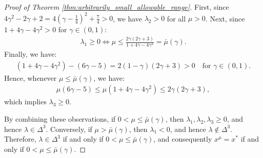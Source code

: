 \documentclass{article}
\theoremstyle{plain}
\begin{document}
\begin{proof}[Proof of Theorem \ref{thm:arbitrarily_small_allowable_range}]
    First, since $4\gamma^2 - 2\gamma + 2 = 4(\gamma - \tfrac{1}{4})^2 + \tfrac{7}{4} > 0$, we have $\lambda_2 > 0$ for all $\mu > 0$.
    Next, since $1 + 4\gamma - 4\gamma^2 > 0$ for $\gamma \in (0, 1)$:
    \begin{align*}
        \lambda_1 \geq 0 \Leftrightarrow \mu \leq \frac{2\gamma(2\gamma+3)}{1 + 4\gamma - 4\gamma^2} = \bar{\mu}(\gamma).
    \end{align*}
    Finally, we have:
    \begin{align*}
        (1 + 4\gamma - 4\gamma^2) - (6\gamma - 5) = 2(1-\gamma)(2\gamma + 3) > 0 \quad \text{for } \gamma \in (0, 1).
    \end{align*}
    Hence, whenever $\mu \leq \bar{\mu}(\gamma)$, we have:
    \begin{align*}
        \mu(6\gamma - 5) \leq \mu(1 + 4\gamma - 4\gamma^2) \leq 2\gamma(2\gamma+3),
    \end{align*}
    which implies $\lambda_3 \geq 0$.

    By combining these observations, if $0 < \mu \leq \bar{\mu}(\gamma)$, then $\lambda_1, \lambda_2, \lambda_3 \geq 0$, and hence $\lambda \in \Delta^3$.
    Conversely, if $\mu > \bar{\mu}(\gamma)$, then $\lambda_1 < 0$, and hence $\lambda \notin \Delta^3$.
    Therefore, $\lambda \in \Delta^3$ if and only if $0 < \mu \leq \bar{\mu}(\gamma)$, and consequently $x^\mu = x^\ast$ if and only if $0 < \mu \leq \bar{\mu}(\gamma)$.
\end{proof}
\end{document}
